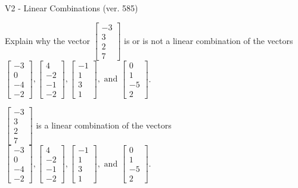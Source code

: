\begin{exercise}
  \begin{exerciseTitle}V2 - Linear Combinations (ver. 585)\end{exerciseTitle}
  \begin{exerciseStatement}
    Explain why the vector \(\left[\begin{array}{c}
-3 \\
3 \\
2 \\
7
\end{array}\right]\)  is or is not a linear 
	combination of the vectors \(\left[\begin{array}{c}
-3 \\
0 \\
-4 \\
-2
\end{array}\right] , \left[\begin{array}{c}
4 \\
-2 \\
-1 \\
-2
\end{array}\right] , \left[\begin{array}{c}
-1 \\
1 \\
3 \\
1
\end{array}\right] , \text{ and } \left[\begin{array}{c}
0 \\
1 \\
-5 \\
2
\end{array}\right]\).
	


  \end{exerciseStatement}
  \begin{exerciseAnswer}
   \(\left[\begin{array}{c}
-3 \\
3 \\
2 \\
7
\end{array}\right]\) 
  	 is  
	a linear combination of the vectors \(\left[\begin{array}{c}
-3 \\
0 \\
-4 \\
-2
\end{array}\right] , \left[\begin{array}{c}
4 \\
-2 \\
-1 \\
-2
\end{array}\right] , \left[\begin{array}{c}
-1 \\
1 \\
3 \\
1
\end{array}\right] , \text{ and } \left[\begin{array}{c}
0 \\
1 \\
-5 \\
2
\end{array}\right]\).


\end{exerciseAnswer}
\end{exercise}
